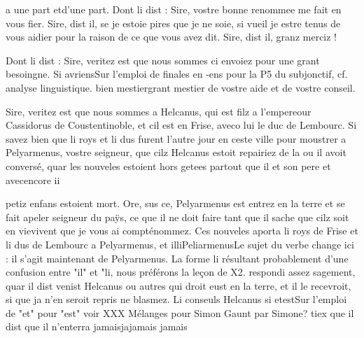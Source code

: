 \documentclass{article}
\begin{document}
\begin{pages}
                  a une part etd'une part. Dont li dist : Sire, vostre bonne renommee me fait
                  en vous fier.
               Sire, dist il, se je estoie pires que je ne soie, si
                  vueil je estre tenus de vous aidier pour la raison de ce que vous avez dit.
               Sire, dist il, granz merciz !
               
                  Dont li dist :
               Sire, veritez est que nous sommes ci envoiez pour
                  une grant besoingne. Si avriensSur l'emploi de finales
                     en -ens pour la P5 du subjonctif, cf. analyse linguistique. bien 
                     mestiergrant mestier de vostre aide et de vostre conseil. \pend
            \pstart 
               
                     Sire, veritez est que nous sommes a Helcanus, qui est filz a l’empereour Cassidorus de Coustentinoble, et cil est en Frise, 
                     aveco lui
                  le duc de Lembourc. Si savez bien que li roys et li dus furent l’autre
                  jour en ceste ville pour moustrer a
                     Pelyarmenus, vostre seigneur, que cilz
                     Helcanus estoit repairiez de la ou il avoit
                  conversé, quar les nouveles estoient hors getees partout que il et son pere et 
                     avecencore
                  ii
                  
                     petiz enfans estoient mort. Ore, sus ce, Pelyarmenus est entrez en la terre et se fait apeler seigneur du
                  paÿs, ce que il ne doit faire tant que il sache que cilz 
                     soit en vievivent que je vous ai 
                     compténommez. Ces nouveles aporta li roys de Frise
                  et li dus de Lembourc a Pelyarmenus, et 
                     illiPeliarmenusLe sujet du verbe change ici : il s'agit
                     maintenant de Pelyarmenus. La forme li résultant probablement d'une confusion
                     entre "il" et "li, nous préférons la leçon de X2. respondi assez
                  sagement, quar il dist venist Helcanus ou autres qui droit eust en la terre, 
                        et il le recevroit, si que ja n’en seroit repris ne blasmez. Li
                  conseuls Helcanus si 
                     etestSur l'emploi de "et" pour "est" voir XXX Mélanges
                     pour Simon Gaunt par Simone? tiex que il dist que il n’enterra 
                        jamaisjajamais jamais
                     

\end{pages}
\end{document}
